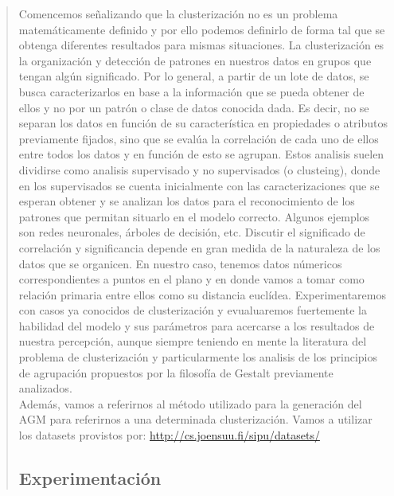 \documentclass[11pt,a4paper]{article}
\begin{document}
\begin{verse}
Comencemos señalizando que la clusterización no es un problema matemáticamente definido y por ello podemos definirlo de forma tal que se obtenga diferentes resultados para mismas situaciones. 
La clusterización es la organización y detección de patrones en nuestros datos en grupos que tengan algún significado. Por lo general, a partir de un lote de datos, se busca caracterizarlos en base a la información que se pueda obtener de ellos y no por un patrón o clase de datos conocida dada. Es decir, no se separan los datos en función de su característica en propiedades o atributos previamente fijados, sino que se evalúa la correlación de cada uno de ellos entre todos los datos y en función de esto se agrupan. Estos analisis suelen dividirse como analisis supervisado y no supervisados (o clusteing), donde en los supervisados se cuenta inicialmente con las caracterizaciones que se esperan obtener y se analizan los datos para el reconocimiento de los patrones que permitan situarlo en el modelo correcto. Algunos ejemplos son redes neuronales, árboles de decisión, etc. Discutir el significado de correlación y significancia depende en gran medida de la naturaleza de los datos que se organicen. En nuestro caso, tenemos datos númericos correspondientes a puntos en el plano y en donde vamos a tomar como relación primaria entre ellos como su distancia euclídea. Experimentaremos con casos ya conocidos de clusterización y evualuaremos fuertemente la habilidad del modelo y sus parámetros para acercarse a los resultados de nuestra percepción, aunque siempre teniendo en mente la literatura del problema de clusterización y particularmente los analisis de los principios de agrupación propuestos por la filosofía de Gestalt previamente analizados.\\
Además, vamos a referirnos al método utilizado para la generación del AGM para referirnos a una determinada clusterización. Vamos a utilizar los datasets provistos por: \url{http://cs.joensuu.fi/sipu/datasets/}

\subsection{Experimentación}


\end{verse}
\end{document}

